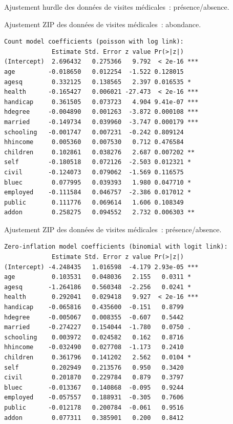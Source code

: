\documentclass{BeamerTemplate}
\begin{document}
\begin{refsection}
\begin{frame}[fragile]{Ajustement hurdle des données de visites médicales~: présence/absence.}
\end{frame}

\begin{frame}[fragile]{Ajustement ZIP des données de visites médicales~: abondance.}

{\scriptsize
\begin{verbatim}
Count model coefficients (poisson with log link):
             Estimate Std. Error z value Pr(>|z|)    
(Intercept)  2.696432   0.275366   9.792  < 2e-16 ***
age         -0.018650   0.012254  -1.522 0.128015    
agesq        0.332125   0.138565   2.397 0.016535 *  
health      -0.165427   0.006021 -27.473  < 2e-16 ***
handicap     0.361505   0.073723   4.904 9.41e-07 ***
hdegree     -0.004890   0.001263  -3.872 0.000108 ***
married     -0.149734   0.039960  -3.747 0.000179 ***
schooling   -0.001747   0.007231  -0.242 0.809124    
hhincome     0.005360   0.007530   0.712 0.476584    
children     0.102861   0.038276   2.687 0.007202 ** 
self        -0.180518   0.072126  -2.503 0.012321 *  
civil       -0.124073   0.079062  -1.569 0.116575    
bluec        0.077995   0.039393   1.980 0.047710 *  
employed    -0.111584   0.046757  -2.386 0.017012 *  
public       0.111776   0.069614   1.606 0.108349    
addon        0.258275   0.094552   2.732 0.006303 ** 
\end{verbatim}
}

\end{frame}

\begin{frame}[fragile]{Ajustement ZIP des données de visites médicales~: présence/absence.}

{\scriptsize
\begin{verbatim}
Zero-inflation model coefficients (binomial with logit link):
             Estimate Std. Error z value Pr(>|z|)    
(Intercept) -4.248435   1.016598  -4.179 2.93e-05 ***
age          0.103531   0.048036   2.155   0.0311 *  
agesq       -1.264186   0.560348  -2.256   0.0241 *  
health       0.292041   0.029418   9.927  < 2e-16 ***
handicap    -0.065816   0.435600  -0.151   0.8799    
hdegree     -0.005067   0.008355  -0.607   0.5442    
married     -0.274227   0.154044  -1.780   0.0750 .  
schooling    0.003972   0.024582   0.162   0.8716    
hhincome    -0.032490   0.027708  -1.173   0.2410    
children     0.361796   0.141202   2.562   0.0104 *  
self         0.202949   0.213576   0.950   0.3420    
civil        0.201870   0.229784   0.879   0.3797    
bluec       -0.013367   0.140868  -0.095   0.9244    
employed    -0.057557   0.188931  -0.305   0.7606    
public      -0.012178   0.200784  -0.061   0.9516    
addon        0.077311   0.385901   0.200   0.8412  
\end{verbatim}
}


\end{frame}
\end{refsection}
\end{document}

